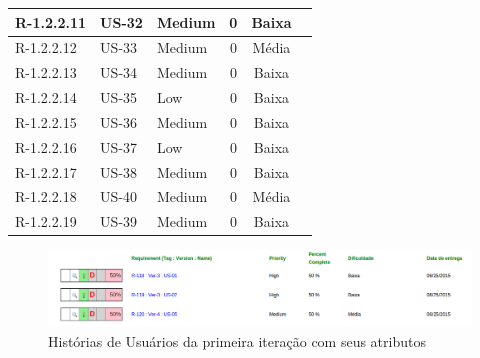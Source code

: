 \begin{table}
\begin{tabular}{ | l | l | l | c | c | c |}
R-1.2.2.11 & US-32 & Medium   & 0                & Baixa       &                 \\\hline
R-1.2.2.12 & US-33 & Medium   & 0                & Média       &                 \\\hline
R-1.2.2.13 & US-34 & Medium   & 0                & Baixa       &                 \\\hline
R-1.2.2.14 & US-35 & Low      & 0                & Baixa       &                 \\\hline
R-1.2.2.15 & US-36 & Medium   & 0                & Baixa       &                 \\\hline
R-1.2.2.16 & US-37 & Low      & 0                & Baixa       &                 \\\hline
R-1.2.2.17 & US-38 & Medium   & 0                & Baixa       &                 \\\hline
R-1.2.2.18 & US-40 & Medium   & 0                & Média       &                 \\\hline
R-1.2.2.19 & US-39 & Medium   & 0                & Baixa       &                 \\\hline
\end{tabular}
\end{table}

\begin{figure}[h]
\centering
\includegraphics[width=1\linewidth]{figuras/iteracao_atributos.png}
\caption{Histórias de Usuários da primeira iteração com seus atributos}
\label{fig:iteracao_atributos}
\end{figure}
